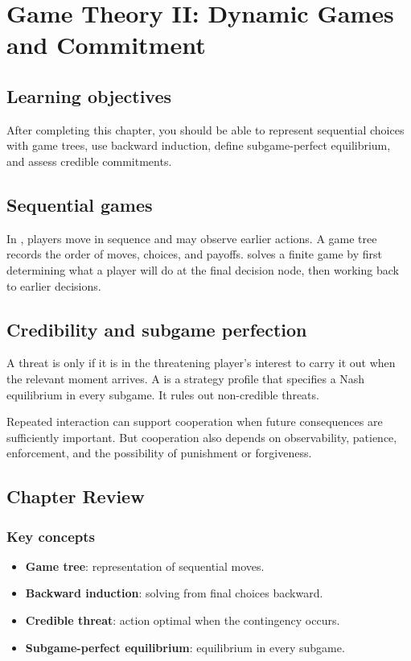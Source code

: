 \chapter{Game Theory II: Dynamic Games and Commitment}
\label{chap:game-theory-dynamic}

\section{Learning objectives}

After completing this chapter, you should be able to represent sequential choices with game trees, use backward induction, define subgame-perfect equilibrium, and assess credible commitments.

\section{Sequential games}

In , players move in sequence and may observe earlier actions. A game tree records the order of moves, choices, and payoffs.  solves a finite game by first determining what a player will do at the final decision node, then working back to earlier decisions.

\section{Credibility and subgame perfection}

A threat is  only if it is in the threatening player's interest to carry it out when the relevant moment arrives. A  is a strategy profile that specifies a Nash equilibrium in every subgame. It rules out non-credible threats.

Repeated interaction can support cooperation when future consequences are sufficiently important. But cooperation also depends on observability, patience, enforcement, and the possibility of punishment or forgiveness.

\section*{Chapter Review}

\subsection*{Key concepts}
\begin{itemize}
  \item \textbf{Game tree}: representation of sequential moves.
  \item \textbf{Backward induction}: solving from final choices backward.
  \item \textbf{Credible threat}: action optimal when the contingency occurs.
  \item \textbf{Subgame-perfect equilibrium}: equilibrium in every subgame.
\end{itemize}

